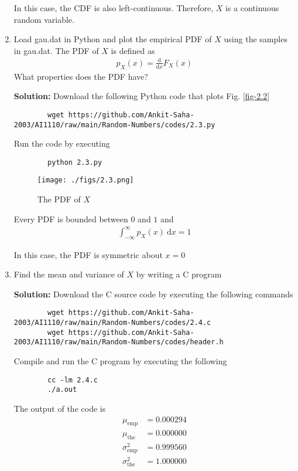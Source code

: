 \documentclass[journal,12pt,twocolumn]{IEEEtran}
\newcommand{\solution}{\noindent \textbf{Solution: }}
\providecommand{\der}[1]{\mathrm{d} #1}
\numberwithin{equation}{section}
\renewcommand\thesection{\arabic{section}}
\begin{document}
\begin{enumerate}[label=\thesection.\arabic*,ref=\thesection.\theenumi]
	In this case, the CDF is also left-continuous. Therefore, $X$ is a continuous random variable.
	
	\item Load gau.dat in Python and plot the empirical PDF of $X$ using the samples in gau.dat. The PDF of $X$ is defined as
	\begin{align}
		p_{X}(x) = \frac{\der{}}{\der{x}}F_{X}(x)
	\end{align}
	What properties does the PDF have?
	
	\solution Download the following Python code that plots Fig. \ref{fig-2.2}
	\begin{lstlisting}
		wget https://github.com/Ankit-Saha-2003/AI1110/raw/main/Random-Numbers/codes/2.3.py
	\end{lstlisting}
	Run the code by executing
	\begin{lstlisting}
		python 2.3.py
	\end{lstlisting}
	\begin{figure}
		\centering
		\texttt{[image: ./figs/2.3.png]}
		\caption{The PDF of $X$}
		\label{fig-2.3}
	\end{figure}
	
	Every PDF is bounded between $0$ and $1$ and
	\begin{align}
		\int_{-\infty}^{\infty} p_{X}(x) ~\mathrm{d}x = 1
	\end{align}
	
	In this case, the PDF is symmetric about $x = 0$
	
	\item Find the mean and variance of $X$ by writing a C program
	
	\solution Download the C source code by executing the following commands
	\begin{lstlisting}
		wget https://github.com/Ankit-Saha-2003/AI1110/raw/main/Random-Numbers/codes/2.4.c
		wget https://github.com/Ankit-Saha-2003/AI1110/raw/main/Random-Numbers/codes/header.h
	\end{lstlisting}
	Compile and run the C program by executing the following
	\begin{lstlisting}
		cc -lm 2.4.c
		./a.out
	\end{lstlisting}
	The output of the code is
	\begin{align}
		\mu_{\text{emp}} &= 0.000294 \\
		\mu_{\text{the}} &= 0.000000 \\
		\sigma_{\text{emp}}^2 &= 0.999560 \\
		\sigma_{\text{the}}^2 &= 1.000000
	\end{align}	
	

\end{enumerate}
\end{document}
